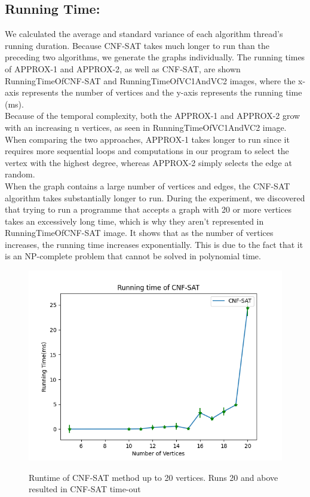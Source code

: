 \documentclass[11pt roman]{article}
\begin{document}
\subsection{ Running Time:}
We calculated the average and standard variance of each algorithm thread's running duration. Because CNF-SAT takes much longer to run than the preceding two algorithms, we generate the graphs individually. The running times of APPROX-1 and APPROX-2, as well as CNF-SAT, are shown RunningTimeOfCNF-SAT and RunningTimeOfVC1AndVC2 images, where the x-axis represents the number of vertices and the y-axis represents the running time (ms).\\

Because of the temporal complexity, both the APPROX-1 and APPROX-2 grow with an increasing n vertices, as seen in RunningTimeOfVC1AndVC2 image. When comparing the two approaches, APPROX-1 takes longer to run since it requires more sequential loops and computations in our program to select the vertex with the highest degree, whereas APPROX-2 simply selects the edge at random. \\


When the graph contains a large number of vertices and edges, the CNF-SAT algorithm takes substantially longer to run. During the experiment, we discovered that trying to run a programme that accepts a graph with 20 or more vertices takes an excessively long time, which is why they aren't represented in RunningTimeOfCNF-SAT image. It shows that as the number of vertices increases, the running time increases exponentially. This is due to the fact that it is an NP-complete problem that cannot be solved in polynomial time. 

\begin{figure}[H]
	\includegraphics[scale=0.6]{RunningTimeOf_CNF-SAT_}\\ %
	\centering
	\caption{Runtime of CNF-SAT method up to 20 vertices. Runs 20 and above resulted in CNF-SAT time-out}
\end{figure}
\end{document}
